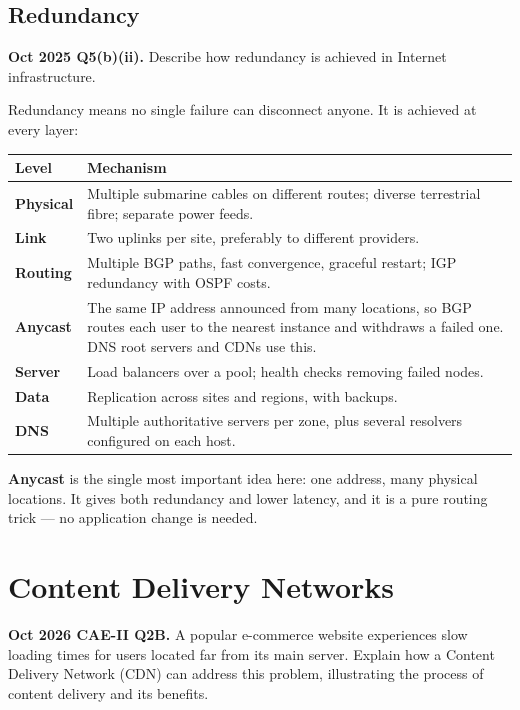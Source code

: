 \documentclass[11pt,a4paper]{article}
\begin{document}
\subsection{Redundancy}

\begin{pyqbox}
\textbf{Oct 2025 Q5(b)(ii).} Describe how redundancy is achieved in Internet infrastructure.
\end{pyqbox}

\begin{solbox}
Redundancy means no single failure can disconnect anyone. It is achieved at every layer:

\begin{center}\small
\begin{tabularx}{\textwidth}{>{\bfseries}p{} X}
\toprule Level & Mechanism\\
\midrule
Physical & Multiple submarine cables on different routes; diverse terrestrial fibre; separate power feeds.\\
Link & Two uplinks per site, preferably to different providers.\\
Routing & Multiple BGP paths, fast convergence, graceful restart; IGP redundancy with OSPF costs.\\
Anycast & The same IP address announced from many locations, so BGP routes each user to the nearest instance and withdraws a failed one. DNS root servers and CDNs use this.\\
Server & Load balancers over a pool; health checks removing failed nodes.\\
Data & Replication across sites and regions, with backups.\\
DNS & Multiple authoritative servers per zone, plus several resolvers configured on each host.\\
\bottomrule
\end{tabularx}
\end{center}

\textbf{Anycast} is the single most important idea here: one address, many physical locations. It gives both redundancy and lower latency, and it is a pure routing trick --- no application change is needed.
\end{solbox}

\section{Content Delivery Networks}

\begin{pyqbox}
\textbf{Oct 2026 CAE-II Q2B.} A popular e-commerce website experiences slow loading times for users located far from its main server. Explain how a Content Delivery Network (CDN) can address this problem, illustrating the process of content delivery and its benefits.
\end{pyqbox}
\end{document}
